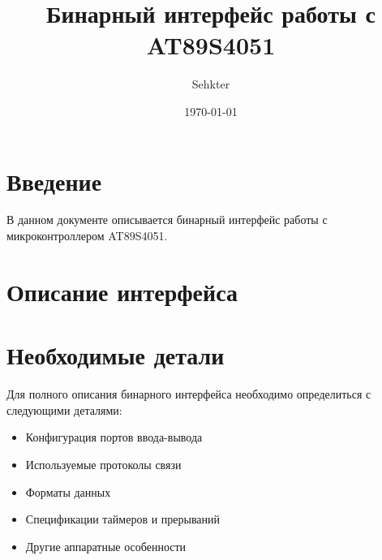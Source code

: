 \documentclass{article}
\title{Бинарный интерфейс работы с AT89S4051}
\author{Sehkter}
\date{\today}
\begin{document}
\maketitle

\section{Введение}
В данном документе описывается бинарный интерфейс работы с микроконтроллером AT89S4051. 

\section{Описание интерфейса}

\section{Необходимые детали}
Для полного описания бинарного интерфейса необходимо определиться с следующими деталями:
\begin{itemize}
    \item Конфигурация портов ввода-вывода
    \item Используемые протоколы связи
    \item Форматы данных
    \item Спецификации таймеров и прерываний
    \item Другие аппаратные особенности
\end{itemize}
\end{document}
